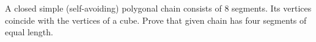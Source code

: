 \problem
A closed simple (self-avoiding) polygonal chain consists of 8 segments.
Its vertices coincide with the vertices of a cube.
Prove that given chain has four segments of equal length.

\solution

\endproblem
